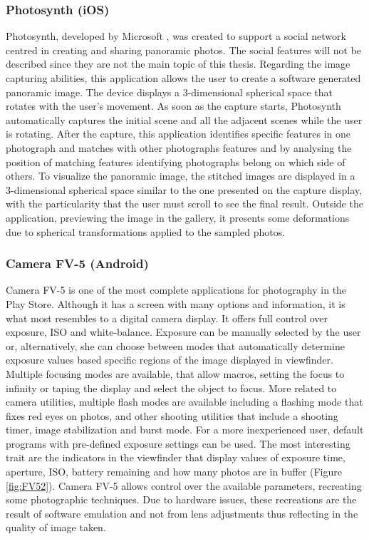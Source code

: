 \subsubsection{Photosynth (iOS)}

Photosynth, developed by Microsoft \cite{Photosynth}, was created to support a social network centred in creating and sharing panoramic photos. The social features will not be described since they are not the main topic of this thesis.
Regarding the image capturing abilities, this application allows the user to create a software generated panoramic image. The device displays a 3-dimensional spherical space that rotates with the user's movement. As soon as the capture starts, Photosynth automatically captures the initial scene and all the adjacent scenes while the user is rotating. After the capture, this application identifies specific features in one photograph and matches with other photographs features and by analysing the position of matching features identifying photographs belong on which side of others. 
To visualize the panoramic image, the stitched images are displayed in a 3-dimensional spherical space similar to the one presented on the capture display, with the particularity that the user must scroll to see the final result. Outside the application, previewing the image in the gallery, it presents some deformations due to spherical transformations applied to the sampled photos. 


\subsubsection{Camera FV-5 (Android)}

Camera FV-5 is one of the most complete applications for photography in the Play Store. Although it has a screen with many options and information, it is what most resembles to a digital camera display. It offers full control over exposure, ISO and white-balance. Exposure can be manually selected by the user or, alternatively, she can choose between modes that automatically determine exposure values based specific regions of the image displayed in viewfinder. 
Multiple focusing modes are available, that allow macros, setting the focus to infinity or taping the display and select the object to focus.
More related to camera utilities, multiple flash modes are available including a flashing mode that fixes red eyes on photos, and other shooting utilities that include a shooting timer, image stabilization and burst mode.
For a more inexperienced user, default programs with pre-defined exposure settings can be used.
The most interesting trait are the indicators in the viewfinder that display values of exposure time, aperture, ISO, battery remaining and how many photos are in buffer (Figure \ref{fig:FV52}).
Camera FV-5 allows control over the available parameters, recreating some photographic techniques. Due to hardware issues, these recreations are the result of software emulation and not from lens adjustments thus reflecting in the quality of image taken.

